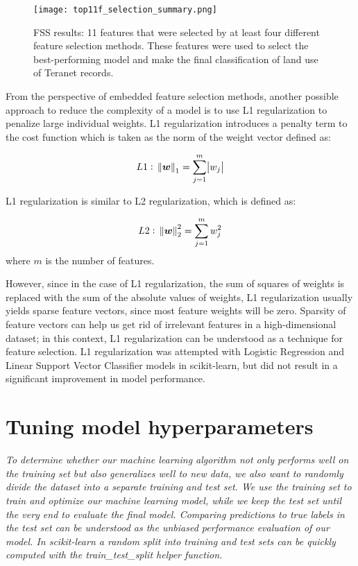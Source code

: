 \begin{figure}[hbt!]
    \centering
    \texttt{[image: top11f\_selection\_summary.png]}
    \caption{FSS results: 11 features that were selected by at least four different feature selection methods.
    These features were used to select the best-performing model and make the final classification of land use of Teranet records.}
    \label{fig:top_feats}
\end{figure}

From the perspective of embedded feature selection methods, another possible approach to reduce the complexity of a model is to use L1 regularization to penalize large individual weights.
L1 regularization introduces a penalty term to the cost function which is taken as the norm of the weight vector defined as:

\begin{equation} \label{eq:l1_regularization}
    L1:~\norm{\boldsymbol{w}}_1 = \sum \limits_{j=1}^m \abs{w_j}
\end{equation}

L1 regularization is similar to L2 regularization, which is defined as:

\begin{equation} \label{eq:l2_regularization}
    L2:~\norm{\boldsymbol{w}}_2^2 = \sum \limits_{j=1}^m w_j^2
\end{equation}
where $m$ is the number of features.

However, since in the case of L1 regularization, the sum of squares of weights is replaced with the sum of the absolute values of weights, L1 regularization usually yields sparse feature vectors, since most feature weights will be zero\cite{RaschkaMirjalili2017,Scikit-learndevelopers2019}.
Sparsity of feature vectors can help us get rid of irrelevant features in a high-dimensional dataset;
in this context, L1 regularization can be understood as a technique for feature selection\cite{RaschkaMirjalili2017}.
L1 regularization was attempted with Logistic Regression and Linear Support Vector Classifier models in scikit-learn, but did not result in a significant improvement in model performance.

\section{Tuning model hyperparameters} \label{sec:tuning_hyperparameters}

\textit{To determine whether our machine learning algorithm not only performs well on the training set but also generalizes well to new data, we also want to randomly divide the dataset into a separate training and test set. We use the training set to train and optimize our machine learning model, while we keep the test set until the very end to evaluate the final model. Comparing predictions to true labels in the test set can be understood as the unbiased performance evaluation of our model. In scikit-learn a random split into training and test sets can be quickly computed with the train\_test\_split helper function.}\cite{RaschkaMirjalili2017}

